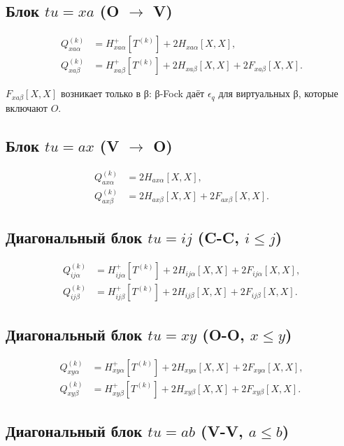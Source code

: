 \documentclass[11pt, a4paper]{article}
\theoremstyle{definition}
\newcommand{\Tk}[2]{T^{(#1)}_{#2}}
\newcommand{\Hp}{H^{+}}
\begin{document}
\subsection{Блок $tu = xa$ (O $\to$ V)}

\begin{align}
    Q^{(k)}_{xa\alpha} &= \Hp_{xa\alpha}[\Tk{k}{}] + 2 H_{xa\alpha}[X, X], \\
    Q^{(k)}_{xa\beta} &= \Hp_{xa\beta}[\Tk{k}{}] + 2 H_{xa\beta}[X, X] + 2 F_{xa\beta}[X, X].
\end{align}

$F_{xa\beta}[X, X]$ возникает только в β: β-Fock даёт $\epsilon_q$ для виртуальных β, которые включают $O$.

\subsection{Блок $tu = ax$ (V $\to$ O)}

\begin{align}
    Q^{(k)}_{ax\alpha} &= 2 H_{ax\alpha}[X, X], \\
    Q^{(k)}_{ax\beta} &= 2 H_{ax\beta}[X, X] + 2 F_{ax\beta}[X, X].
\end{align}

\subsection{Диагональный блок $tu = ij$ (C-C, $i \le j$)}

\begin{align}
    Q^{(k)}_{ij\alpha} &= \Hp_{ij\alpha}[\Tk{k}{}] + 2 H_{ij\alpha}[X, X] + 2 F_{ij\alpha}[X, X], \\
    Q^{(k)}_{ij\beta} &= \Hp_{ij\beta}[\Tk{k}{}] + 2 H_{ij\beta}[X, X] + 2 F_{ij\beta}[X, X].
\end{align}

\subsection{Диагональный блок $tu = xy$ (O-O, $x \le y$)}

\begin{align}
    Q^{(k)}_{xy\alpha} &= \Hp_{xy\alpha}[\Tk{k}{}] + 2 H_{xy\alpha}[X, X] + 2 F_{xy\alpha}[X, X], \\
    Q^{(k)}_{xy\beta} &= \Hp_{xy\beta}[\Tk{k}{}] + 2 H_{xy\beta}[X, X] + 2 F_{xy\beta}[X, X].
\end{align}

\subsection{Диагональный блок $tu = ab$ (V-V, $a \le b$)}
\end{document}

